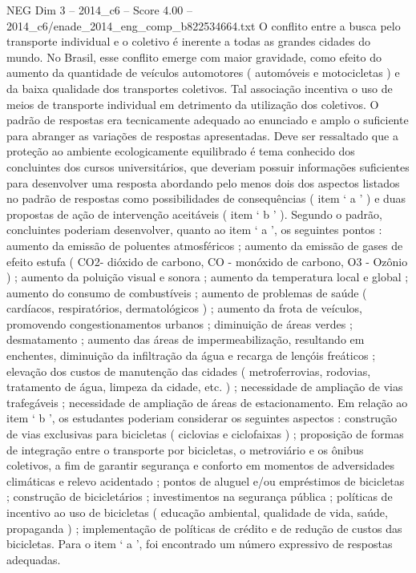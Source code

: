 \begin{textsample}{NEG Dim 3 – 2014\_c6 – Score 4.00 – 2014\_c6/enade\_2014\_eng\_comp\_b822534664.txt}
O conflito entre a busca pelo transporte individual e o coletivo é inerente a todas as grandes cidades do mundo.
No Brasil, esse conflito emerge com maior gravidade, como efeito do aumento da quantidade de veículos automotores ( automóveis e motocicletas ) e da baixa qualidade dos transportes coletivos.
Tal associação incentiva o uso de meios de transporte individual em detrimento da utilização dos coletivos.
O padrão de respostas era tecnicamente adequado ao enunciado e amplo o suficiente para abranger as variações de respostas apresentadas.
Deve ser ressaltado que a proteção ao ambiente ecologicamente equilibrado é tema conhecido dos concluintes dos cursos universitários, que deveriam possuir informações suficientes para desenvolver uma resposta abordando pelo menos dois dos aspectos listados no padrão de respostas como possibilidades de consequências ( item ‘ a ’ ) e duas propostas de ação de intervenção aceitáveis ( item ‘ b ’ ).
Segundo o padrão, concluintes poderiam desenvolver, quanto ao item ‘ a ’, os seguintes pontos : aumento da emissão de poluentes atmosféricos ; aumento da emissão de gases de efeito estufa ( CO2- dióxido de carbono, CO - monóxido de carbono, O3 - Ozônio ) ; aumento da poluição visual e sonora ; aumento da temperatura local e global ; aumento do consumo de combustíveis ; aumento de problemas de saúde ( cardíacos, respiratórios, dermatológicos ) ; aumento da frota de veículos, promovendo congestionamentos urbanos ; diminuição de áreas verdes ; desmatamento ; aumento das áreas de impermeabilização, resultando em enchentes, diminuição da infiltração da água e recarga de lençóis freáticos ; elevação dos custos de manutenção das cidades ( metroferrovias, rodovias, tratamento de água, limpeza da cidade, etc. ) ; necessidade de ampliação de vias trafegáveis ; necessidade de ampliação de áreas de estacionamento.
Em relação ao item ‘ b ’, os estudantes poderiam considerar os seguintes aspectos : construção de vias exclusivas para bicicletas ( ciclovias e ciclofaixas ) ; proposição de formas de integração entre o transporte por bicicletas, o metroviário e os ônibus coletivos, a fim de garantir segurança e conforto em momentos de adversidades climáticas e relevo acidentado ; pontos de aluguel e/ou empréstimos de bicicletas ; construção de bicicletários ; investimentos na segurança pública ; políticas de incentivo ao uso de bicicletas ( educação ambiental, qualidade de vida, saúde, propaganda ) ; implementação de políticas de crédito e de redução de custos das bicicletas.
Para o item ‘ a ’, foi encontrado um número expressivo de respostas adequadas.

\end{textsample}
